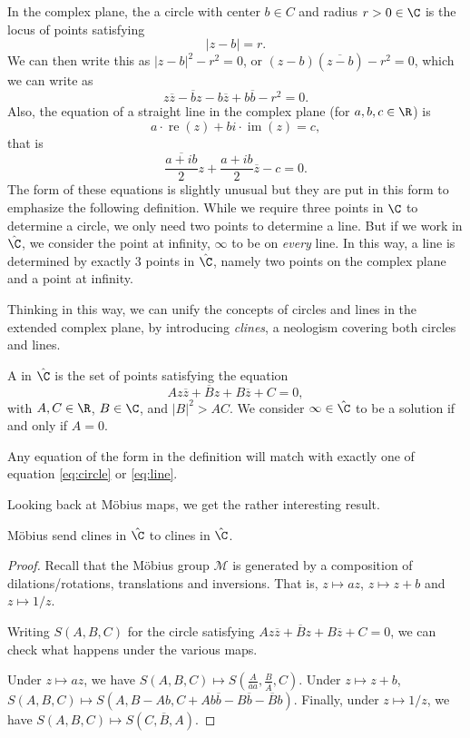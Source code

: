 \documentclass[a4]{scrreprt}
\begin{document}
In the complex plane, the a circle with center $b \in C$ and radius $r > 0 \in \C$ is the locus of points satisfying
$$
|z - b| = r.
$$
We can then write this as $|z - b|^2 - r^2 = 0$, or $(z - b)(\overline{z - b}) - r^2 = 0$, which we can write as
\begin{equation}\label{eq:circle}
	z \overline{z} - \overline{b}z - b \overline{z} + b \overline{b} - r^2 = 0.
	\tag{$*$}
\end{equation}
Also, the equation of a straight line in the complex plane (for $a, b, c \in \R$) is
$$
	a \cdot \operatorname{re}(z) + bi \cdot \operatorname{im}(z) = c,
$$
that is
\begin{equation}\label{eq:line}
\frac{\overline{a + i b}}{2}z + \frac{a + ib}{2} \overline{z} - c = 0.
\tag{$\dagger$}	
\end{equation}
The form of these equations is slightly unusual but they are put in this form to emphasize the following definition.
While we require three points in $\C$ to determine a circle, we only need two points to determine a line. But if we work in $\hat{\C}$, we consider the point at infinity, $\infty$ to be on \emph{every} line. In this way, a line is determined by exactly 3 points in $\hat{\C}$, namely two points on the complex plane and a point at infinity.

Thinking in this way, we can unify the concepts of circles and lines in the extended complex plane, by introducing \emph{clines}, a neologism covering both circles and lines. 

\begin{definition}
A  in $\hat{\C}$ is the set of points satisfying the equation
$$
A z \overline{z} + \overline{B}z + B \overline{z} + C = 0,
$$
with $A, C \in \R$, $B \in \C$, and $|B|^2 > AC$. We consider $\infty \in \hat{\C}$ to be a solution if and only if $A = 0$.  
\end{definition}

Any equation of the form in the definition will match with exactly one of equation \eqref{eq:circle} or \eqref{eq:line}.

Looking back at Möbius maps, we get the rather interesting result.
\begin{theorem}
	Möbius send clines in $\hat{\C}$ to clines in $\hat{\C}$.
\end{theorem}
\begin{proof}
	Recall that the Möbius group $\mathcal{M}$ is generated by a composition of dilations/rotations, translations and inversions. That is, $z \mapsto az$, $z \mapsto z + b$ and $z \mapsto 1/z$.

	Writing $S(A, B, C)$ for the circle satisfying $A z \overline{z} + \overline{B}z + B \overline{z} + C = 0$, we can check what happens under the various maps.

	Under $z \mapsto az$, we have $S(A, B, C) \mapsto S\left(\frac{A}{\overline{a}a}, \frac{B}{\overline{A}}, C\right)$. Under $z \mapsto z + b$, $S(A, B, C) \mapsto S(A, B - Ab, C + A b \overline{b} - B \overline{b} - \overline{B} b)$. Finally, under $z \mapsto 1/z$, we have $S(A, B, C) \mapsto S(C, \overline{B}, A)$.
\end{proof}
\end{document}
